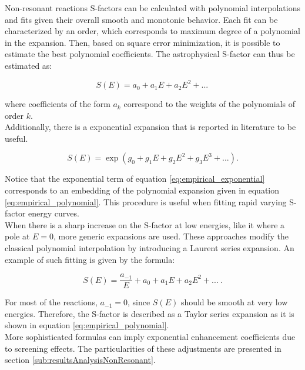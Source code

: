 \documentclass[openany]{book}
\begin{document}
Non-resonant reactions S-factors can be calculated with polynomial interpolations and fits given their overall smooth and monotonic behavior. Each fit can be characterized by an order, which corresponds to maximum degree of a polynomial in the expansion. Then, based on square error minimization, it is possible to estimate the best polynomial coefficients. The astrophysical S-factor can thus be estimated as:

\begin{equation}  \label{eq:empirical_polynomial}
	S(E) = a_0 + a_1E + a_2 E^2 + ... \, 
\end{equation}

where coefficients of the form $a_k$ correspond to the weights of the polynomials of order $k$. \\

Additionally,  there is a exponential expansion that is reported in literature to be useful. 

\begin{equation} \label{eq:empirical_exponential}
	S(E) = \exp{(g_0 + g_1E + g_2E^2 + g_3E^3 + ...)}.
\end{equation}

Notice that the exponential term of equation \ref{eq:empirical_exponential} corresponds to an embedding of the polynomial expansion given in equation \ref{eq:empirical_polynomial}. This procedure is useful when fitting rapid varying S-factor energy curves. \\

When there is a sharp increase on the S-factor at low energies, like it where a pole at $E = 0$,  more generic expansions are used. These approaches modify the classical polynomial interpolation by introducing a Laurent series expansion. An example of such fitting is given by the formula: 

\begin{equation}  \label{eq:empirical_laurent}
	S(E) =\frac{ a_{-1}}{E} + a_0 + a_1 E + a_2 E^2 + ... \ .
\end{equation}

For most of the reactions, $a_{-1} = 0$, since $S(E)$ should be smooth at very low energies. Therefore, the S-factor is  described as a Taylor series expansion as it is shown in equation \ref{eq:empirical_polynomial}. \\

More sophisticated formulas can imply exponential enhancement coefficients due to screening effects. The particularities of these adjustments are presented in section \ref{sub:resultsAnalysisNonResonant}. 
\end{document}
